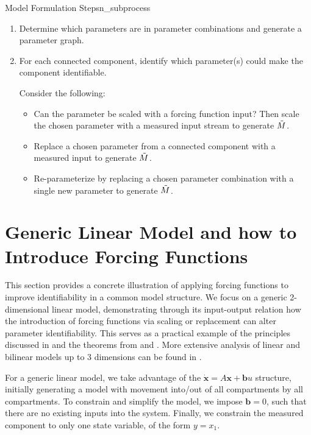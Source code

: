 \documentclass[a4paper,fleqn]{cas-dc}
\theoremstyle{definition}
\begin{document}
\begin{mynote}{Model Formulation Steps}{n_subprocess}
        \begin{enumerate}
            \item Determine which parameters are in parameter combinations and generate a parameter graph.
            \item For each connected component, identify which parameter(s) could make the component identifiable. 

            \noindent Consider the following:
            \begin{itemize}
                \item Can the parameter be scaled with a forcing function input? Then scale the chosen parameter with a measured input stream to generate $\Tilde{M}$.

                \item Replace a chosen parameter from a connected component with a measured input to generate $\Tilde{M}$. 
                \item Re-parameterize by replacing a chosen parameter combination with a single new parameter to generate $\Tilde{M}$. 
            \end{itemize}  
        \end{enumerate}
    \label{n_subprocess}
\end{mynote}


\section{Generic Linear Model and how to Introduce Forcing Functions} \label{s:generic_ex_main}

This section provides a concrete illustration of applying forcing functions to improve identifiability in a common model structure. We focus on a generic 2-dimensional linear model, demonstrating through its input-output relation how the introduction of forcing functions via scaling or replacement can alter parameter identifiability. This serves as a practical example of the principles discussed in  and the theorems from  and . More extensive analysis of linear and bilinear models up to 3 dimensions can be found in .

For a generic linear model, we take advantage of the $\dot{\pmb{x}} = A\pmb{x} + \pmb{b}u$ structure, initially generating a model with movement into/out of all compartments by all compartments.
To constrain and simplify the model, we impose $\pmb{b} = 0$, such that there are no existing inputs into the system.
Finally, we constrain the measured component to only one state variable, of the form $y =x_1$.
\end{document}
